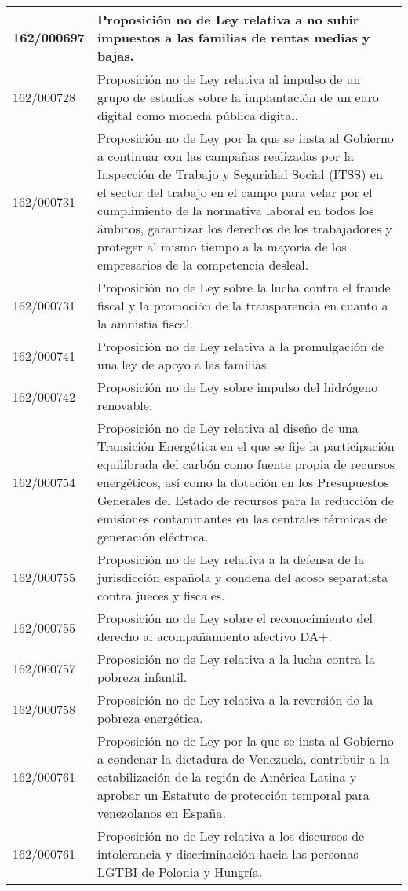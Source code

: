 {\begin{table}[H]
\begin{center}
\begin{tabularx}{\linewidth}{| l | X |}
\hline
162/000697 & Proposición no de Ley relativa a no subir impuestos a las familias de rentas medias y bajas. \\
\hline
162/000728 & Proposición no de Ley relativa al impulso de un grupo de estudios sobre la implantación de un euro digital como moneda pública digital. \\
\hline
162/000731 & Proposición no de Ley por la que se insta al Gobierno a continuar con las campañas realizadas por la Inspección de Trabajo y Seguridad Social (ITSS) en el sector del trabajo en el campo para velar por el cumplimiento de la normativa laboral en todos los ámbitos, garantizar los derechos de los trabajadores y proteger al mismo tiempo a la mayoría de los empresarios de la competencia desleal. \\
\hline
162/000731 & Proposición no de Ley sobre la lucha contra el fraude fiscal y la promoción de la transparencia en cuanto a la amnistía fiscal. \\
\hline
162/000741 & Proposición no de Ley relativa a la promulgación de una ley de apoyo a las familias. \\
\hline
162/000742 & Proposición no de Ley sobre impulso del hidrógeno renovable. \\
\hline
162/000754 & Proposición no de Ley relativa al diseño de una Transición Energética en el que se fije la participación equilibrada del carbón como fuente propia de recursos energéticos, así como la dotación en los Presupuestos Generales del Estado de recursos para la reducción de emisiones contaminantes en las centrales térmicas de generación eléctrica. \\
\hline
162/000755 & Proposición no de Ley relativa a la defensa de la jurisdicción española y condena del acoso separatista contra jueces y fiscales. \\
\hline
162/000755 & Proposición no de Ley sobre el reconocimiento del derecho al acompañamiento afectivo DA+. \\
\hline
162/000757 & Proposición no de Ley relativa a la lucha contra la pobreza infantil. \\
\hline
162/000758 & Proposición no de Ley relativa a la reversión de la pobreza energética. \\
\hline
162/000761 & Proposición no de Ley por la que se insta al Gobierno a condenar la dictadura de Venezuela, contribuir a la estabilización de la región de América Latina y aprobar un Estatuto de protección temporal para venezolanos en España. \\
\hline
162/000761 & Proposición no de Ley relativa a los discursos de intolerancia y discriminación hacia las personas LGTBI de Polonia y Hungría. \\

\end{tabularx}
\end{center}
\end{table}}
